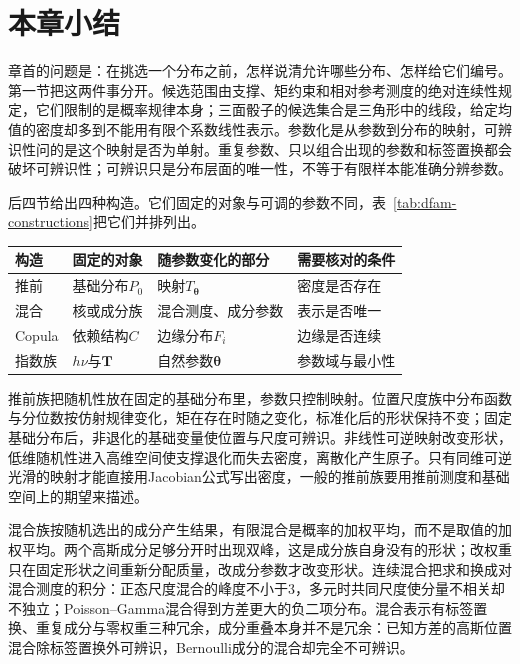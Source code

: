 \section{本章小结}
\label{sec:dfam-summary}

章首的问题是：在挑选一个分布之前，怎样说清允许哪些分布、怎样给它们编号。第一节把这两件事分开。候选范围由支撑、矩约束和相对参考测度的绝对连续性规定，它们限制的是概率规律本身；三面骰子的候选集合是三角形中的线段，给定均值的密度却多到不能用有限个系数线性表示。参数化是从参数到分布的映射，可辨识性问的是这个映射是否为单射。重复参数、只以组合出现的参数和标签置换都会破坏可辨识性；可辨识只是分布层面的唯一性，不等于有限样本能准确分辨参数。

后四节给出四种构造。它们固定的对象与可调的参数不同，表~\ref{tab:dfam-constructions}把它们并排列出。

\begin{BookInlineTable}
  \centering
  \caption{四种构造分布族的方式}
  \label{tab:dfam-constructions}
  \begin{tabular}{@{}llll@{}}
    \toprule
    构造 & 固定的对象 & 随参数变化的部分 & 需要核对的条件\\
    \midrule
    推前 & 基础分布$P_0$ & 映射$T_{\bm{\theta}}$ & 密度是否存在\\
    混合 & 核或成分族 & 混合测度、成分参数 & 表示是否唯一\\
    Copula & 依赖结构$C$ & 边缘分布$F_i$ & 边缘是否连续\\
    指数族 & $h\nu$与$\bm{T}$ & 自然参数$\bm{\theta}$ & 参数域与最小性\\
    \bottomrule
  \end{tabular}
\end{BookInlineTable}

推前族把随机性放在固定的基础分布里，参数只控制映射。位置尺度族中分布函数与分位数按仿射规律变化，矩在存在时随之变化，标准化后的形状保持不变；固定基础分布后，非退化的基础变量使位置与尺度可辨识。非线性可逆映射改变形状，低维随机性进入高维空间使支撑退化而失去密度，离散化产生原子。只有同维可逆光滑的映射才能直接用Jacobian公式写出密度，一般的推前族要用推前测度和基础空间上的期望来描述。

混合族按随机选出的成分产生结果，有限混合是概率的加权平均，而不是取值的加权平均。两个高斯成分足够分开时出现双峰，这是成分族自身没有的形状；改权重只在固定形状之间重新分配质量，改成分参数才改变形状。连续混合把求和换成对混合测度的积分：正态尺度混合的峰度不小于$3$，多元时共同尺度使分量不相关却不独立；Poisson–Gamma混合得到方差更大的负二项分布。混合表示有标签置换、重复成分与零权重三种冗余，成分重叠本身并不是冗余：已知方差的高斯位置混合除标签置换外可辨识，Bernoulli成分的混合却完全不可辨识。

